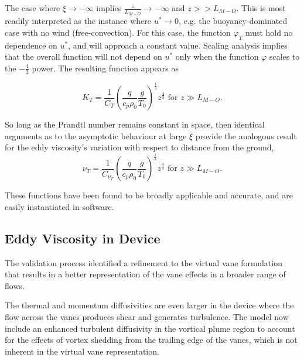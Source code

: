 The case where $\xi \to -\infty $ implies $\frac{z}{L_{M-O}} \to
-\infty $ and $z>>L_{M-O}$. This is most readily interpreted as the instance
where $u^* \to 0$, e.g. the buoyancy-dominated case with no wind
(free-convection). For this case, the function $\varphi_T$ must hold no
dependence on $u^*$, and will approach a constant value. Scaling
analysis implies that the overall function will not depend on $u^*$ only
when the function $\varphi$ scales to the $-\frac{4}{3}$ power. The
resulting function appears as

\begin{equation}
 K_T = \frac{1}{C_T} \left( \frac{q}{c_p \rho_0} \frac{g}{T_0}
		     \right)^\frac{1}{3} z^{\frac{4}{3}}  \text{ 
for } z \gg L_{M-O}. 
\end{equation}

So long as the Prandtl number remains constant in space, then
identical arguments as to the asymptotic behaviour at large $\xi$ provide
the analogous result for the eddy viscosity's variation with respect to
distance from the ground,  
\begin{equation}
 \nu_T = \frac{1}{C_{\nu_T}} \left( \frac{q}{c_p \rho_0} \frac{g}{T_0}
			     \right)^\frac{1}{3} z^{\frac{4}{3}}  \text{ 
for } z \gg L_{M-O}. 
\end{equation}

These functions have been found to be broadly applicable and
accurate\cite{Foken2006}, and are easily instantiated in software.

\subsection{Eddy Viscosity in Device}

The validation process identified a refinement to the virtual vane
formulation that results in a better representation of the vane
effects in a broader range of flows. 

The thermal and momentum diffusivities are even larger in the
device where the flow across the vanes produces shear and generates
turbulence. The model now include an enhanced turbulent diffusivity in
the vortical plume region to account for the effects of vortex shedding
from the trailing edge of the vanes, which is not inherent in the
virtual vane representation.   


